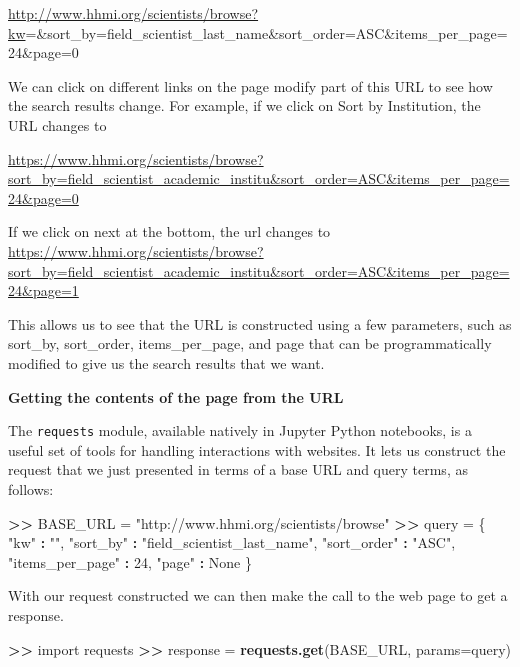 \documentclass[]{krantz}
\newenvironment{Shaded}{\begin{snugshade}}{\end{snugshade}}
\newcommand{\KeywordTok}[1]{\textcolor[rgb]{0.13,0.29,0.53}{\textbf{#1}}}
\newcommand{\DataTypeTok}[1]{\textcolor[rgb]{0.13,0.29,0.53}{#1}}
\newcommand{\DecValTok}[1]{\textcolor[rgb]{0.00,0.00,0.81}{#1}}
\newcommand{\StringTok}[1]{\textcolor[rgb]{0.31,0.60,0.02}{#1}}
\newcommand{\OperatorTok}[1]{\textcolor[rgb]{0.81,0.36,0.00}{\textbf{#1}}}
\newcommand{\ErrorTok}[1]{\textcolor[rgb]{0.64,0.00,0.00}{\textbf{#1}}}
\newcommand{\NormalTok}[1]{#1}
\begin{document}
\url{http://www.hhmi.org/scientists/browse?kw}=\&sort\_by=field\_scientist\_last\_name\&sort\_order=ASC\&items\_per\_page=24\&page=0

We can click on different links on the page modify part of this URL to
see how the search results change. For example, if we click on Sort by
Institution, the URL changes to

\url{https://www.hhmi.org/scientists/browse?sort_by=field_scientist_academic_institu\&sort_order=ASC\&items_per_page=24\&page=0}

If we click on next at the bottom, the url changes to
\url{https://www.hhmi.org/scientists/browse?sort_by=field_scientist_academic_institu\&sort_order=ASC\&items_per_page=24\&page=1}

This allows us to see that the URL is constructed using a few
parameters, such as sort\_by, sort\_order, items\_per\_page, and page
that can be programmatically modified to give us the search results that
we want.

\textbf{Getting the contents of the page from the URL}

The \texttt{requests} module, available natively in Jupyter Python
notebooks, is a useful set of tools for handling interactions with
websites. It lets us construct the request that we just presented in
terms of a base URL and query terms, as follows:

\begin{Shaded}
\begin{Highlighting}[]
\OperatorTok{>}\ErrorTok{>}\StringTok{ }\NormalTok{BASE_URL =}\StringTok{ "http://www.hhmi.org/scientists/browse"}
\OperatorTok{>}\ErrorTok{>}\StringTok{ }\NormalTok{query =}\StringTok{ }\NormalTok{\{}
            \StringTok{"kw"} \OperatorTok{:}\StringTok{ ""}\NormalTok{,}
            \StringTok{"sort_by"} \OperatorTok{:}\StringTok{ "field_scientist_last_name"}\NormalTok{,}
            \StringTok{"sort_order"} \OperatorTok{:}\StringTok{ "ASC"}\NormalTok{,}
            \StringTok{"items_per_page"} \OperatorTok{:}\StringTok{ }\DecValTok{24}\NormalTok{,}
            \StringTok{"page"} \OperatorTok{:}\StringTok{ }\NormalTok{None}
\NormalTok{           \}}
\end{Highlighting}
\end{Shaded}

With our request constructed we can then make the call to the web page
to get a response.

\begin{Shaded}
\begin{Highlighting}[]
\OperatorTok{>}\ErrorTok{>}\StringTok{ }\NormalTok{import requests}
\OperatorTok{>}\ErrorTok{>}\StringTok{ }\NormalTok{response =}\StringTok{ }\KeywordTok{requests.get}\NormalTok{(BASE_URL, }\DataTypeTok{params=}\NormalTok{query)}
\end{Highlighting}
\end{Shaded}
\end{document}
